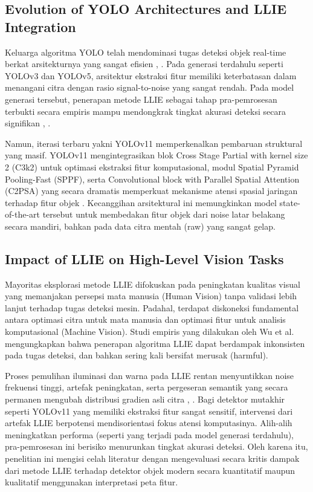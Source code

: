 \documentclass[conference]{IEEEtran}
\begin{document}
\subsection{Evolution of YOLO Architectures and LLIE Integration}
Keluarga algoritma YOLO telah mendominasi tugas deteksi objek real-time berkat arsitekturnya yang sangat efisien \cite{terven2023yoloreview}, \cite{sapkota2025yoloreview}. Pada generasi terdahulu seperti YOLOv3 dan YOLOv5, arsitektur ekstraksi fitur memiliki keterbatasan dalam menangani citra dengan rasio signal-to-noise yang sangat rendah. Pada model generasi tersebut, penerapan metode LLIE sebagai tahap pra-pemrosesan terbukti secara empiris mampu mendongkrak tingkat akurasi deteksi secara signifikan \cite{shovo2024lowlight}, \cite{wang2023yolov5lowlight}.

Namun, iterasi terbaru yakni YOLOv11 memperkenalkan pembaruan struktural yang masif. YOLOv11 mengintegrasikan blok Cross Stage Partial with kernel size 2 (C3k2) untuk optimasi ekstraksi fitur komputasional, modul Spatial Pyramid Pooling-Fast (SPPF), serta Convolutional block with Parallel Spatial Attention (C2PSA) yang secara dramatis memperkuat mekanisme atensi spasial jaringan terhadap fitur objek \cite{khanam2024yolov11}. Kecanggihan arsitektural ini memungkinkan model state-of-the-art tersebut untuk membedakan fitur objek dari noise latar belakang secara mandiri, bahkan pada data citra mentah (raw) yang sangat gelap.

\subsection{Impact of LLIE on High-Level Vision Tasks}
Mayoritas eksplorasi metode LLIE difokuskan pada peningkatan kualitas visual yang memanjakan persepsi mata manusia (Human Vision) tanpa validasi lebih lanjut terhadap tugas deteksi mesin. Padahal, terdapat diskoneksi fundamental antara optimasi citra untuk mata manusia dan optimasi fitur untuk analisis komputasional (Machine Vision). Studi empiris yang dilakukan oleh Wu et al. \cite{wu2024llieeffect} mengungkapkan bahwa penerapan algoritma LLIE dapat berdampak inkonsisten pada tugas deteksi, dan bahkan sering kali bersifat merusak (harmful). 

Proses pemulihan iluminasi dan warna pada LLIE rentan menyuntikkan noise frekuensi tinggi, artefak peningkatan, serta pergeseran semantik yang secara permanen mengubah distribusi gradien asli citra \cite{wu2024llieeffect}, \cite{gong2025multiscale}. Bagi detektor mutakhir seperti YOLOv11 yang memiliki ekstraksi fitur sangat sensitif, intervensi dari artefak LLIE berpotensi mendisorientasi fokus atensi komputasinya. Alih-alih meningkatkan performa (seperti yang terjadi pada model generasi terdahulu), pra-pemrosesan ini berisiko menurunkan tingkat akurasi deteksi. Oleh karena itu, penelitian ini mengisi celah literatur dengan mengevaluasi secara kritis dampak dari metode LLIE terhadap detektor objek modern secara kuantitatif maupun kualitatif menggunakan interpretasi peta fitur.
\end{document}
